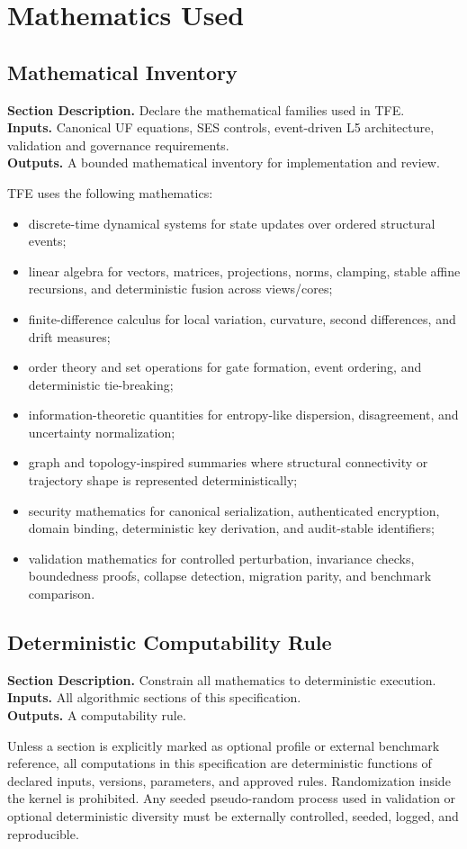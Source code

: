 \documentclass[11pt]{report}
\newcommand{\meta}[3]{\textbf{Section Description.} #1\\
\textbf{Inputs.} #2\\
\textbf{Outputs.} #3\par}
\begin{document}
\chapter{Mathematics Used}
\section{Mathematical Inventory}
\meta{Declare the mathematical families used in TFE.}{Canonical UF equations, SES controls, event-driven L5 architecture, validation and governance requirements.}{A bounded mathematical inventory for implementation and review.}

TFE uses the following mathematics:
\begin{itemize}
    \item discrete-time dynamical systems for state updates over ordered structural events;
    \item linear algebra for vectors, matrices, projections, norms, clamping, stable affine recursions, and deterministic fusion across views/cores;
    \item finite-difference calculus for local variation, curvature, second differences, and drift measures;
    \item order theory and set operations for gate formation, event ordering, and deterministic tie-breaking;
    \item information-theoretic quantities for entropy-like dispersion, disagreement, and uncertainty normalization;
    \item graph and topology-inspired summaries where structural connectivity or trajectory shape is represented deterministically;
    \item security mathematics for canonical serialization, authenticated encryption, domain binding, deterministic key derivation, and audit-stable identifiers;
    \item validation mathematics for controlled perturbation, invariance checks, boundedness proofs, collapse detection, migration parity, and benchmark comparison.
\end{itemize}

\section{Deterministic Computability Rule}
\meta{Constrain all mathematics to deterministic execution.}{All algorithmic sections of this specification.}{A computability rule.}

Unless a section is explicitly marked as optional profile or external benchmark reference, all computations in this specification are deterministic functions of declared inputs, versions, parameters, and approved rules. Randomization inside the kernel is prohibited. Any seeded pseudo-random process used in validation or optional deterministic diversity must be externally controlled, seeded, logged, and reproducible.
\end{document}
